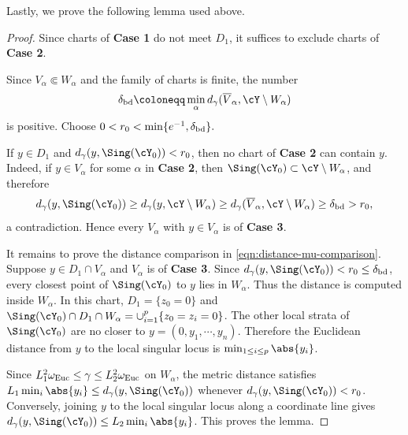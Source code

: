 \documentclass[12pt]{amsart}
\begin{document}
Lastly, we prove the following lemma used above.

\begin{proof}
    Since charts of \textbf{Case 1} do not meet $D_1$, it suffices to
    exclude charts of \textbf{Case 2}.

    Since $V_\alpha\Subset W_\alpha$ and the family of charts is finite, the
    number
    \[
        \delta_{\rm bd}\coloneqq
        \min_\alpha d_\gamma(\overline{V}_\alpha,\cY\setminus W_\alpha)
    \]
    is positive. Choose
    \(
        0<r_0<\min\{e^{-1},\delta_{\rm bd}\}.
    \)

    If $y\in D_1$ and $d_\gamma(y,\Sing(\cY_0))<r_0$, then no chart of
    \textbf{Case 2} can contain $y$. Indeed, if $y\in V_\alpha$ for some
    $\alpha$ in \textbf{Case 2}, then
    $\Sing(\cY_0)\subset \cY\setminus W_\alpha$, and therefore
    \[
        d_\gamma(y,\Sing(\cY_0))
        \ge d_\gamma(y,\cY\setminus W_\alpha)
        \ge d_\gamma(\overline{V}_\alpha,\cY\setminus W_\alpha)
        \ge \delta_{\rm bd}
        > r_0,
    \]
    a contradiction. Hence every $V_\alpha$ with $y\in V_\alpha$ is of
    \textbf{Case 3}.

    It remains to prove the distance comparison in
    \cref{eqn:distance-mu-comparison}. Suppose $y\in D_1\cap V_\alpha$ and
    $V_\alpha$ is of \textbf{Case 3}. Since
    $d_\gamma(y,\Sing(\cY_0))<r_0\leq\delta_{\rm bd}$, every closest point of
    $\Sing(\cY_0)$ to $y$ lies in $W_\alpha$. Thus the distance is computed
    inside $W_\alpha$. In this chart, $D_1=\{z_0=0\}$ and
    $\Sing(\cY_0)\cap D_1\cap W_\alpha
    =\cup_{i=1}^p\{z_0=z_i=0\}$. The other local strata of
    $\Sing(\cY_0)$ are no closer to $y=(0,y_1,\cdots,y_n)$. Therefore the
    Euclidean distance from $y$ to the local singular locus is
    $\min_{1\leq i\leq p}\abs{y_i}$.

    Since $L_1^2\omega_{\rm Euc}\leq\gamma\leq
    L_2^2\omega_{\rm Euc}$ on $W_\alpha$, the metric distance satisfies
    $L_1\min_i\abs{y_i}\leq d_\gamma(y,\Sing(\cY_0))$ whenever
    $d_\gamma(y,\Sing(\cY_0))<r_0$. Conversely, joining $y$ to the local
    singular locus along a coordinate line gives
    $d_\gamma(y,\Sing(\cY_0))\leq L_2\min_i\abs{y_i}$. This proves the
    lemma.
\end{proof}
\end{document}

